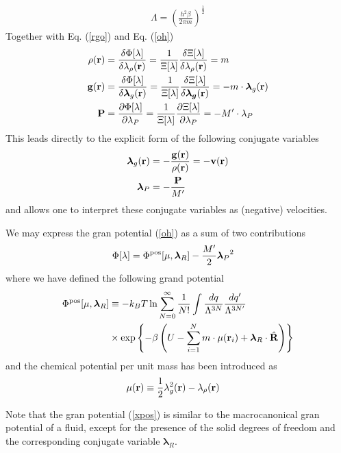 \documentclass[b5paper,openright,11pt]{book}
\begin{document}
\begin{align}
\Lambda=\left(\frac{h^2\beta}{2\pi m}\right)^{\frac{1}{2}}
\label{ThermalWave}
\end{align}
Together with Eq. (\ref{rgo}) and Eq. (\ref{oh})
\begin{align}
  \rho({\bf r}) &=\frac{\delta \Phi [\lambda]}{\delta \lambda_\rho({\bf r}) } = \frac{1}{\Xi[\lambda]} \frac{\delta\Xi [\lambda]}{\delta \lambda_{\rho}({\bf r})} = m
  \nonumber\\
  {\bf g}({\bf r}) &=\frac{\delta \Phi [\lambda]}{\delta \boldsymbol{\lambda}_g({\bf r}) } =\frac{1}{\Xi[\lambda]} \frac{\delta\Xi [\lambda]}{\delta \boldsymbol{\lambda_g}({\bf r})} = -m\cdot\boldsymbol{\lambda}_g({\bf r})
 \nonumber\\
  {\bf P} &=\frac{\partial \Phi [\lambda]}{\partial \lambda_P} =\frac{1}{\Xi[\lambda]} \frac{\partial\Xi [\lambda]}{\partial \lambda_P} = -M'\cdot\lambda_P
\end{align}
This leads directly to the explicit form of the following conjugate variables
\begin{align}
 \boldsymbol{\lambda}_g({\bf r}) &= -\frac{{\bf g}({\bf r})}{\rho({\bf r})}=-{\bf v}({\bf r})
\nonumber\\
 \boldsymbol{\lambda}_P &= -\frac{{\bf P}}{M'}
\label{nu}
\end{align}
and allows  one to interpret  these conjugate variables  as (negative)
velocities.  


We may express the gran potential (\ref{oh}) as a sum of two contributions
\begin{align}
\Phi [\lambda]&=  \Phi^{\rm pos}[\mu,\boldsymbol{\lambda}_R]
-\frac{M'}{2} {\boldsymbol{\lambda}_P}^2
\end{align}
where we have defined the following grand potential
\begin{align}
\Phi^{\rm pos}[\mu,\boldsymbol{\lambda}_R]
&\equiv-k_BT\ln
 \sum_{N=0}^\infty \frac{1}{N!}
\int \frac{dq}{\Lambda^{3N}}\frac{dq'}{\Lambda^{3N'}}\nonumber\\
&\times
\exp\left\{-\beta  \left(U-\sum_{i=1}^N m\cdot\mu({\bf
    r}_i)+ \boldsymbol{\lambda}_R\cdot\hat{\bf R}\right)\right\}
\label{xpos}
\end{align}
and the chemical potential per unit mass has been introduced as
\begin{align}
  \mu({\bf r})&\equiv\frac{1}{2}\lambda_g^2({\bf r})-\lambda_\rho({\bf r})
\label{chempot}
\end{align}

Note that the gran potential (\ref{xpos}) is similar to the macrocanonical gran potential of a fluid, except for the presence of the solid degrees of freedom and the corresponding conjugate variable $\boldsymbol{\lambda}_R$. 
\end{document}
